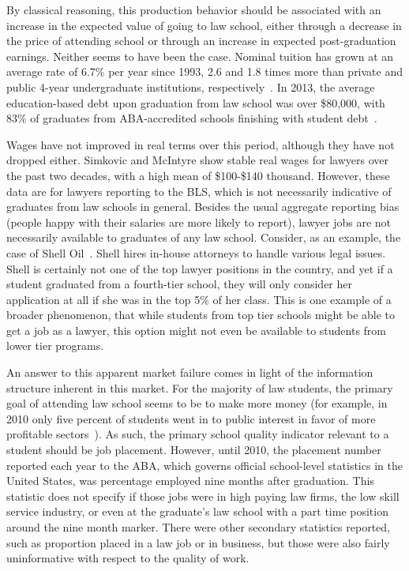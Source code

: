\documentclass[12pt]{article}
\theoremstyle{definition}
\begin{document}
By classical reasoning, this production behavior should be associated with an increase in the expected value of going to law school, either through a decrease in the price of attending school or through an increase in expected post-graduation earnings. Neither seems to have been the case. Nominal tuition has grown at an average rate of 6.7\% per year since 1993, 2.6 and 1.8 times more than private and public 4-year undergraduate institutions, respectively~\cite{CollegeBoard}. In 2013, the average education-based debt upon graduation from law school was over \$80,000, with 83\% of graduates from ABA-accredited schools finishing with student debt~\cite{USNews}.

Wages have not improved in real terms over this period, although they have not dropped either. Simkovic and McIntyre \cite{SimkovicMcIntyre} show stable real wages for lawyers over the past two decades, with a high mean of \$100-\$140 thousand. However, these data are for lawyers reporting to the BLS, which is not necessarily indicative of graduates from law schools in general. Besides the usual aggregate reporting bias (people happy with their salaries are more likely to report), lawyer jobs are not necessarily available to graduates of any law school. Consider, as an example, the case of Shell Oil~\cite{abovethelaw}. Shell hires in-house attorneys to handle various legal issues. Shell is certainly not one of the top lawyer positions in the country, and yet if a student graduated from a fourth-tier school, they will only consider her application at all if she was in the top 5\% of her class. This is one example of a broader phenomenon, that while students from top tier schools might be able to get a job as a lawyer, this option might not even be available to students from lower tier programs.

An answer to this apparent market failure comes in light of the information structure inherent in this market. For the majority of law students, the primary goal of attending law school seems to be to make more money (for example, in 2010 only five percent of students went in to public interest in favor of more profitable sectors~\cite{nalpSalaries}). As such, the primary school quality indicator relevant to a student should be job placement. However, until 2010, the placement number reported each year to the ABA, which governs official school-level statistics in the United States, was percentage employed nine months after graduation. This statistic does not specify if those jobs were in high paying law firms, the low skill service industry, or even at the graduate's law school with a part time position around the nine month marker. There were other secondary statistics reported, such as proportion placed in a law job or in business, but those were also fairly uninformative with respect to the quality of work.
\end{document}
